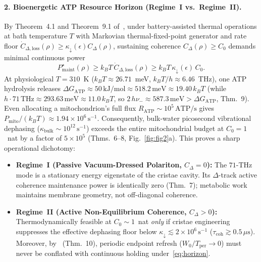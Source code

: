 \documentclass[10pt,twocolumn]{article}
\begin{document}
\paragraph{2. Bioenergetic ATP Resource Horizon (Regime~I vs.\ Regime~II).}
By Theorem~4.1 and Theorem~9.1 of~\cite{Eriksson2025GeometryMembranes,Eriksson2025MaintenanceWork}, under battery-assisted thermal operations at bath temperature $T$ with Markovian thermal-fixed-point generator and rate floor $\dot{C}_{\Delta,\mathrm{loss}}(\rho) \ge \kappa_\downarrow(\epsilon) C_\Delta(\rho)$, sustaining coherence $C_\Delta(\rho) \ge C_0$ demands minimal continuous power
\begin{equation}
\label{eq:horizon}
P_{\mathrm{maint}}^\star(\rho) \ge k_B T\,\dot{C}_{\Delta,\mathrm{loss}}(\rho) \ge k_B T\,\kappa_\downarrow(\epsilon)\,C_0.
\end{equation}
At physiological $T = 310$~K ($k_B T \approx 26.71$~meV, $k_B T/h \approx 6.46$~THz), one ATP hydrolysis releases $\Delta G_{\mathrm{ATP}} \approx 50\,\mathrm{kJ/mol} \approx 518.2\,\mathrm{meV} \approx 19.40\,k_B T$ (while $h\cdot 71\,\mathrm{THz} \approx 293.63\,\mathrm{meV} \approx 11.0\,k_B T$, so $2\,h\nu_- \approx 587.3\,\mathrm{meV} > \Delta G_{\mathrm{ATP}}$, Thm.~9). Even allocating a mitochondrion's full flux $R_{\mathrm{ATP}} \sim 10^5\,\mathrm{ATP/s}$ gives $P_{\mathrm{mito}}/(k_B T) \approx 1.94\times 10^6\,\mathrm{s}^{-1}$. Consequently, bulk-water picosecond vibrational dephasing ($\kappa_{\mathrm{bulk}} \sim 10^{12}\,\mathrm{s}^{-1}$) exceeds the entire mitochondrial budget at $C_0=1$~nat by a factor of $5\times 10^5$ (Thms.~6--8, Fig.~\ref{fig:fig2}a). This proves a sharp operational dichotomy:
\begin{itemize}\itemsep 1pt
\item \textbf{Regime~I (Passive Vacuum-Dressed Polariton, $C_\Delta = 0$):} The $71$-THz mode is a stationary energy eigenstate of the cristae cavity. Its $\Delta$-track active coherence maintenance power is identically zero (Thm.~7); metabolic work maintains membrane geometry, not off-diagonal coherence.
\item \textbf{Regime~II (Active Non-Equilibrium Coherence, $C_\Delta > 0$):} Thermodynamically feasible at $C_0 \sim 1$~nat \emph{only} if cristae engineering suppresses the effective dephasing floor below $\kappa_\downarrow \lesssim 2\times 10^6\,\mathrm{s}^{-1}$ ($\tau_{\mathrm{coh}} \gtrsim 0.5\,\mu\mathrm{s}$). Moreover, by~\cite{Eriksson2026MaintenanceNotRestoration} (Thm.~10), periodic endpoint refresh ($W_0/T_{\mathrm{per}}\to 0$) must never be conflated with continuous holding under~\eqref{eq:horizon}.
\end{itemize}
\end{document}
